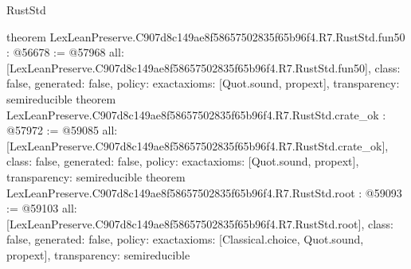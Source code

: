 \begin{lexlean}{RustStd}
\begin{coremodule}
{}
theorem LexLeanPreserve.C907d8c149ae8f58657502835f65b96f4.R7.RustStd.fun50 : @56678 := @57968 {
  all: [LexLeanPreserve.C907d8c149ae8f58657502835f65b96f4.R7.RustStd.fun50],
  class: false,
  generated: false,
  policy: exact{axioms: [Quot.sound, propext]},
  transparency: semireducible
}
theorem LexLeanPreserve.C907d8c149ae8f58657502835f65b96f4.R7.RustStd.crate_ok : @57972 := @59085 {
  all: [LexLeanPreserve.C907d8c149ae8f58657502835f65b96f4.R7.RustStd.crate_ok],
  class: false,
  generated: false,
  policy: exact{axioms: [Quot.sound, propext]},
  transparency: semireducible
}
theorem LexLeanPreserve.C907d8c149ae8f58657502835f65b96f4.R7.RustStd.root : @59093 := @59103 {
  all: [LexLeanPreserve.C907d8c149ae8f58657502835f65b96f4.R7.RustStd.root],
  class: false,
  generated: false,
  policy: exact{axioms: [Classical.choice, Quot.sound, propext]},
  transparency: semireducible
}


\end{coremodule}
\end{lexlean}
